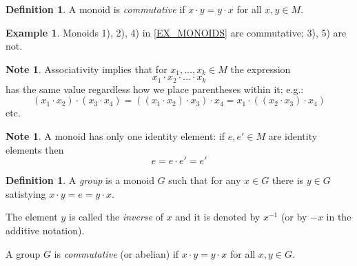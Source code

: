 \documentclass[12pt, letterpaper, oneside]{article}
\theoremstyle{plain}
\theoremstyle{definition}
\newtheorem{definition}[theorem]{Definition}
\newtheorem{example}[theorem]{Example}
\newtheorem{note}[theorem]{Note}
\newcommand{\vs}{\vskip 5mm}
\begin{document}
\vskip 5mm


\begin{definition}
A monoid is \emph{commutative} if $x\cdot y = y\cdot x$ for all $x, y\in M$. 
\end{definition}

\begin{example}
Monoids 1), 2), 4) in \ref{EX_MONOIDS} are commutative; 3), 5) are not. 
\end{example}

\vskip 5mm

\begin{note}
Associativity implies that for $x_{1},  \dots, x_{k}\in M$ the 
expression 
$$x_{1}\cdot x_{2}\cdot \dots \cdot x_{k}$$ 
has the same value regardless how we place parentheses within it; e.g.: 
$$(x_{1}\cdot x_{2})\cdot (x_{3}\cdot x_{4})=((x_{1}\cdot x_{2})\cdot x_{3})\cdot x_{4}=
x_{1}\cdot ((x_{2}\cdot x_{3})\cdot x_{4})$$ etc.
\end{note}

\vs

\begin{note}
A monoid has only one identity element: if $e, e'\in M$ are identity elements then 
$$e=e\cdot e' = e'$$
\end{note}

\vs


\begin{definition}
A \emph{group} is a monoid $G$ such that for any $x\in G$ there is $y\in G$
satistying $x\cdot y= e = y\cdot x$.

The element $y$ is called the \emph{inverse} of $x$ and it is denoted by $x^{-1}$
(or by $-x$ in the additive notation).

A group $G$ is \emph{commutative} (or abelian) if $x\cdot y = y\cdot x$ for all $x, y\in G$.
\end{definition}

\vskip 5mm
\end{document}
